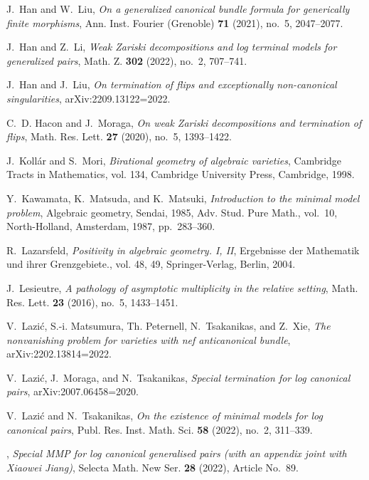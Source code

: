 \begin{thebibliography}{BCHM10}
J.~Han and W.~Liu, \emph{On a generalized canonical bundle formula for
  generically finite morphisms}, Ann. Inst. Fourier (Grenoble) \textbf{71}
  (2021), no.~5, 2047--2077.

J.~Han and Z.~Li, \emph{Weak {Z}ariski decompositions and log terminal models
  for generalized pairs}, Math. Z. \textbf{302} (2022), no.~2, 707--741.

J.~Han and J.~Liu, \emph{On termination of flips and exceptionally
  non-canonical singularities}, arXiv:2209.13122=\hbox{2022}.

C.~D. Hacon and J.~Moraga, \emph{On weak {Z}ariski decompositions and
  termination of flips}, Math. Res. Lett. \textbf{27} (2020), no.~5,
  1393--1422.

J.~Koll{\'a}r and S.~Mori, \emph{Birational geometry of algebraic varieties},
  Cambridge Tracts in Mathematics, vol. 134, Cambridge University Press,
  Cambridge, 1998.

Y.~Kawamata, K.~Matsuda, and K.~Matsuki, \emph{Introduction to the minimal
  model problem}, Algebraic geometry, {S}endai, 1985, Adv. Stud. Pure Math.,
  vol.~10, North-Holland, Amsterdam, 1987, pp.~283--360.

R.~Lazarsfeld, \emph{Positivity in algebraic geometry. {I, II}}, Ergebnisse der
  Mathematik und ihrer Grenzgebiete., vol. 48, 49, Springer-Verlag, Berlin,
  2004.

J.~Lesieutre, \emph{A pathology of asymptotic multiplicity in the relative
  setting}, Math. Res. Lett. \textbf{23} (2016), no.~5, 1433--1451.

V.~Lazi\'c, S.-i. Matsumura, Th. Peternell, N.~Tsakanikas, and Z.~Xie,
  \emph{The nonvanishing problem for varieties with nef anticanonical bundle},
  arXiv:2202.13814=\hbox{2022}.

V.~Lazi\'c, J.~Moraga, and N.~Tsakanikas, \emph{Special termination for log
  canonical pairs}, arXiv:2007.06458=\hbox{2020}.

V.~Lazi\'c and N.~Tsakanikas, \emph{On the existence of minimal models for log
  canonical pairs}, Publ. Res. Inst. Math. Sci. \textbf{58} (2022), no.~2,
  311--339.

\bysame, \emph{Special {MMP} for log canonical generalised pairs (with an
  appendix joint with {X}iaowei {J}iang)}, Selecta Math. New Ser. \textbf{28}
  (2022), Article No.\ 89.


\end{thebibliography}
